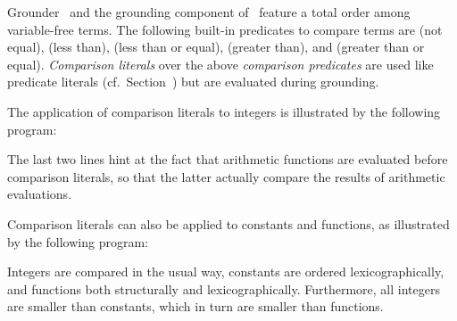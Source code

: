 Grounder \gringo\ and the grounding component of \clingo\ 
feature a total order among variable-free terms.
The following built-in predicates to compare terms are
\code{!=} (not equal),
\code{<} (less than),
\code{<=} (less than or equal),
\code{>} (greater than), and
\code{>=} (greater than or equal).
\emph{Comparison literals} over the above \emph{comparison predicates} are used like predicate literals (cf.\ Section~\pageref{subsec:gringo:normal})
but are evaluated during grounding.

\begin{example}\label{ex:arith:pred}
The application of comparison literals to integers
is illustrated by the following program:%
%

%
The last two lines hint at the fact that arithmetic functions are evaluated
before comparison literals, so that the latter actually compare the
results of arithmetic evaluations.
\eexample
\end{example}

\begin{example}\label{ex:symb:pred}
Comparison literals can also be applied to constants and functions,
as illustrated by the following program:%
%

%
Integers are compared in the usual way, constants are ordered lexicographically,
and functions both structurally and lexicographically.
Furthermore, all integers are smaller than constants,
which in turn are smaller than functions.
\eexample
\end{example}

